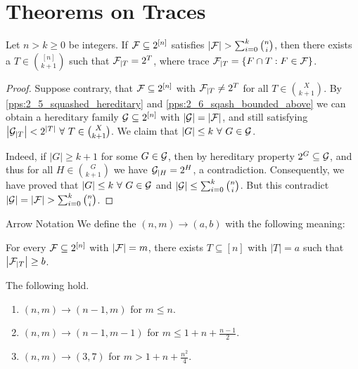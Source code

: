 \section{Theorems on Traces}

\begin{theorem}[thm:]{}
    Let $n>k\geq 0$ be integers. If $\mathcal{F}\subseteq 2^{[n]}$ satisfies $\left|\FF\right|>\sum_{i=0}^{k}{n\choose i}$, then there exists a $T\in {[n]\choose k+1}$ such that $\mathcal{F}_{|T}=2^T$, where trace $\mathcal{F}_{|T}=\left\{F\cap T:F\in \mathcal{F}\right\}$.
\end{theorem}

\begin{proof}
    Suppose contrary, that $\mathcal{F}\subseteq 2^{[n]}$ with $\mathcal{F}_{|T}\neq 2^{T}$ for all $T\in {X\choose k+1}$. By \cref{pps:2_5_squashed_hereditary} and \cref{pps:2_6_sqash_bounded_above} we can obtain a hereditary family $\mathcal{G}\subseteq 2^{[n]}$ with $\left|\mathcal{G}\right|=\left|\mathcal{F}\right|$, and still satisfying $\left|\mathcal{G}_{|T}\right|<2^{|T|}\ \forall\ T\in {X\choose k+1}$. We claim that $\left|G\right|\leq k\ \forall\ G\in \mathcal{G}$.

    Indeed, if $\left|G\right|\geq k+1$ for some $G\in \mathcal{G}$, then by hereditary property $2^G\subseteq \mathcal{G}$, and thus for all $H\in {G\choose k+1}$ we have $\mathcal{G}_{|H}=2^H$, a contradiction. Consequently, we have proved that $\left|G\right|\leq k\ \forall\ G\in \mathcal{G}$ and $\left|\mathcal{G}\right|\leq \sum_{i=0}^{k}{n\choose i}$. But this contradict $\left|\GG\right|=\left|\FF\right|>\sum_{i=0}^{k}{n\choose i}$.
\end{proof}

\begin{definition}[def:]{Arrow Notation}
    We define the  $(n,m)\rightarrow (a,b)$ with the following meaning:

    For every $\mathcal{F}\subseteq 2^{[n]}$ with $\left|\mathcal{F}\right|=m$, there exists $T\subseteq [n]$ with $\left|T\right|=a$ such that $\left|\mathcal{F}_{|T}\right|\geq b$.
\end{definition}

\begin{theorem}[thm:]{}
    The following hold.
    \begin{enumerate}
        \item $(n,m)\rightarrow (n-1,m)$ for $m\leq n$.
        \item $(n,m)\rightarrow (n-1,m-1)$ for $m\leq 1+n+\frac{n-1}{2}$.
        \item $(n,m)\rightarrow (3,7)$ for $m>1+n+\frac{n^2}{4}$.
    \end{enumerate}
\end{theorem}

